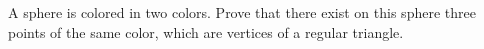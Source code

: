A sphere is colored in two colors. Prove that there exist on this sphere three points of the same color, which are vertices of a regular triangle.
